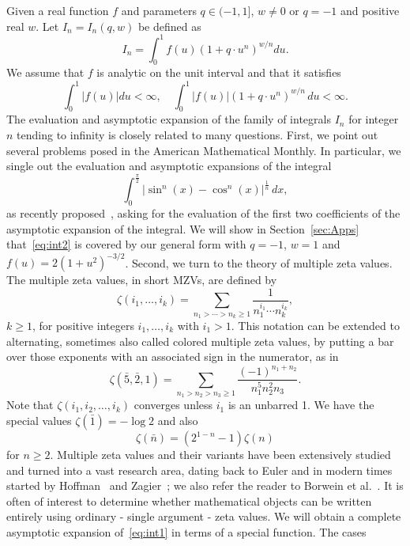 \documentclass[10pt,reqno,a4paper]{amsart}%
\theoremstyle{definition}
\begin{document}
Given a real function $f$ and parameters $q\in(-1,1]$, $w\neq0$ or $q=-1$ and positive real $w$. Let
$I_{n}=I_{n}(q,w)$ be defined as
\begin{equation}
I_{n}=\int_{0}^{1}f(u)(1+q\cdot u^{n})^{w/n}du.\label{eq:int1}%
\end{equation}
We assume that $f$ is analytic on the unit interval and that it satisfies
\[
\int_{0}^{1}|f(u)|du<\infty,\quad\int_{0}^{1}|f(u)|(1+q\cdot u^{n}%
)^{w/n}\,du<\infty.
\]
The evaluation and asymptotic expansion of the family of integrals $I_{n}$ for
integer $n$ tending to infinity is closely related to many questions. First,
we point out several problems posed in the American Mathematical Monthly. In
particular, we single out the evaluation and asymptotic expansions of the
integral
\begin{equation}
\int_{0}^{\frac{\pi}{2}}\bigl|\sin^{n}(x)-\cos^{n}(x)\bigr|^{\frac{1}{n}%
}\,dx,\label{eq:int2}%
\end{equation}
as recently proposed~\cite{AMM2025}, asking for the evaluation of the first
two coefficients of the asymptotic expansion of the integral. We will show in
Section~\ref{sec:Apps} that~\eqref{eq:int2} is covered by our general form
with $q=-1$, $w=1$ and $f(u)=2(1+u^{2})^{-3/2}$.
Second, we turn to the theory of multiple zeta values. The multiple zeta
values, in short MZVs, are defined by
\[
\zeta(i_{1},\dots,i_{k})=\sum_{n_{1}>\cdots>n_{k}\geq1}\frac{1}{n_{1}^{i_{1}%
}\cdots n_{k}^{i_{k}}},
\]
$k\geq1$, for positive integers $i_{1},\dots,i_{k}$ with $i_{1}>1$. This
notation can be extended to alternating, sometimes also called colored
multiple zeta values, by putting a bar over those exponents with an associated
sign in the numerator, as in
\[
\zeta(\bar{5},\bar{2},1)=\sum_{n_{1}>n_{2}>n_{3}\geq1}\frac{(-1)^{n_{1}+n_{2}%
}}{n_{1}^{5}n_{2}^{2}n_{3}}.
\]
Note that $\zeta(i_{1},i_{2},\dots,i_{k})$ converges unless $i_{1}$ is an
unbarred 1. We have the special values $\zeta(\bar{1})=-\log2$ and also
\[
\zeta(\bar{n})=(2^{1-n}-1)\zeta(n)
\]
for $n\geq2$. Multiple zeta values and their variants have been extensively
studied and turned into a vast research area, dating back to Euler and in
modern times started by Hoffman~\cite{H1992} and Zagier~\cite{Z1992}; we also
refer the reader to Borwein et al.~\cite{BBB}. It is often of interest to
determine whether mathematical objects can be written entirely using ordinary
- single argument - zeta values. We will obtain a complete asymptotic
expansion of~\eqref{eq:int1} in terms of a special function. The cases
\end{document}
